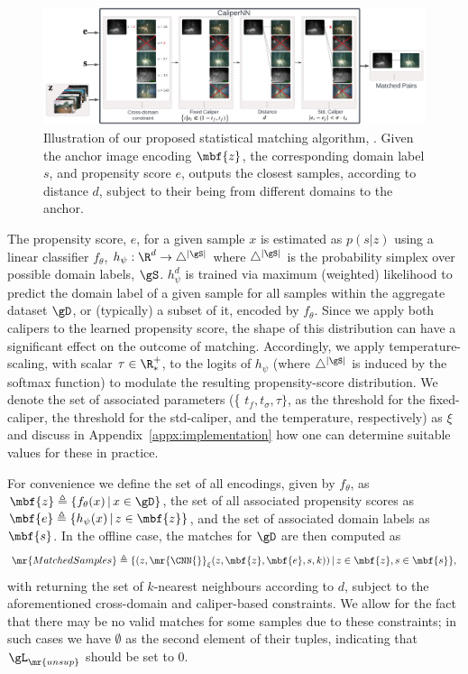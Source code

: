 \begin{figure}[tbp]
  \centering
  \includegraphics[width=1.\textwidth]{figures/CaliperNN_PS_pipeline.pdf}
  \caption{
    Illustration of our proposed statistical matching algorithm, \CNN{}. Given the anchor image
    encoding $\mbf{z}$, the corresponding domain label $s$, and propensity score $e$, \CNN{}
    outputs the closest samples, according to distance $d$, subject to their being from different
    domains to the anchor.
}
  \label{fig:calipernn_pipeline}
\end{figure}

%
The propensity score, $e$, for a given sample $x$ is estimated as $p(s|z)$ using a linear
classifier $f_\theta$, $h_\psi: \R^d \to \bigtriangleup^{|\gS|}$ where $\bigtriangleup^{|\gS|}$ is
the probability simplex over possible domain labels, $\gS$. $h_\psi^d$ is trained via maximum
(weighted) likelihood to predict the domain label of a given sample for all samples within the
aggregate dataset $\gD$, or (typically) a subset of it, encoded by $f_\theta$.
%
Since we apply both calipers to the learned propensity score, the shape of this distribution can
have a significant effect on the outcome of matching.
%
Accordingly, we apply temperature-scaling, with scalar $\tau \in \R^+_\ast$, to the logits of
$h_\psi$ (where $\bigtriangleup^{|\gS|}$ is induced by the softmax function) to modulate the
resulting propensity-score distribution.
%
We denote the set of associated parameters (\{ $t_{f}, t_{\sigma}, \tau \}$, as the threshold for
the fixed-caliper, the threshold for the std-caliper, and the temperature, respectively) as $\xi$
and discuss in Appendix~\ref{appx:implementation} how one can determine suitable values for these
in practice.

For convenience we define the set of all encodings, given by $f_\theta$, as $\mbf{z} \triangleq \{
f_\theta (x)\, |\, x \in \gD \}$, the set of all associated propensity scores as $\mbf{e}
\triangleq \{ h_\psi (x) \, | \, z \in \mbf{z} \}$, and the set of associated domain labels as
$\mbf{s}$.
%
In the offline case, the matches for $\gD$ are then computed as
%
\begin{equation}
  \mr{MatchedSamples} \triangleq \{ (z,  \mr{\CNN{}}_\xi(z, \mbf{z}, \mbf{e}, s, k)) \, | \, z \in
    \mbf{z}, s \in \mbf{s} \},
\end{equation}
%
with \CNN{} returning the set of $k$-nearest neighbours according to $d$, subject to the
aforementioned cross-domain and caliper-based constraints. We allow for the fact that there may be
no valid matches for some samples due to these constraints; in such cases we have $\emptyset$ as
the second element of their tuples, indicating that $\gL_{\mr{unsup}}$ should be set to $0$.
%
